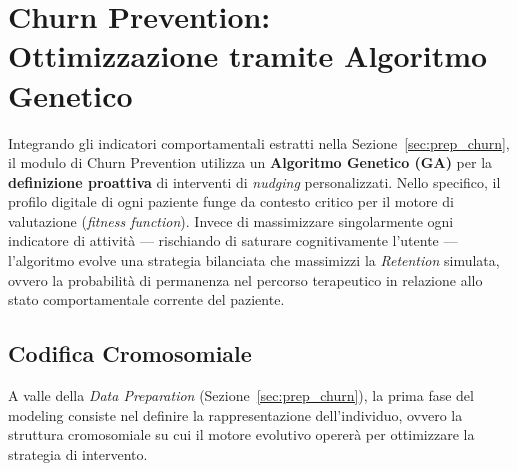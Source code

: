 \section{Churn Prevention: \\ Ottimizzazione tramite Algoritmo Genetico}
\label{sec:churn_modeling}

Integrando gli indicatori comportamentali estratti nella Sezione~\ref{sec:prep_churn}, il modulo di Churn Prevention utilizza un \textbf{Algoritmo Genetico (GA)} per la \textbf{definizione proattiva} di interventi di \textit{nudging} \cite{thaler2008nudge} personalizzati. Nello specifico, il profilo digitale di ogni paziente funge da contesto critico per il motore di valutazione (\textit{fitness function}). Invece di massimizzare singolarmente ogni indicatore di attività --- rischiando di saturare cognitivamente l'utente --- l'algoritmo evolve una strategia bilanciata che massimizzi la \textit{Retention} simulata, ovvero la probabilità di permanenza nel percorso terapeutico in relazione allo stato comportamentale corrente del paziente.

\subsection{Codifica Cromosomiale}
A valle della \textit{Data Preparation} (Sezione~\ref{sec:prep_churn}), la prima fase del modeling consiste nel definire la rappresentazione dell'individuo, ovvero la struttura cromosomiale su cui il motore evolutivo opererà per ottimizzare la strategia di intervento.


